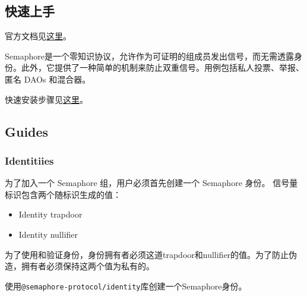 \documentclass[10pt]{ctexart}
\begin{document}
\subsection{快速上手}
官方文档见\href{https://semaphore.appliedzkp.org/}{这里}。

Semaphore是一个零知识协议，允许作为可证明的组成员发出信号，而无需透露身份。此外，它提供了一种简单的机制来防止双重信号。用例包括私人投票、举报、匿名 DAOs 和混合器。

快速安装步骤见\href{https://semaphore.appliedzkp.org/docs/quick-setup}{这里}。
\subsection{Guides}
\subsubsection{Identitiies}
为了加入一个 Semaphore 组，用户必须首先创建一个 Semaphore 身份。 信号量标识包含两个随标识生成的值：
\begin{itemize}
	\item Identity trapdoor
	\item Identity nullifier
\end{itemize}
为了使用和验证身份，身份拥有者必须这道trapdoor和nullifier的值。为了防止伪造，拥有者必须保持这两个值为私有的。

使用\verb|@semaphore-protocol/identity|库创建一个Semaphore身份。
\end{document}
